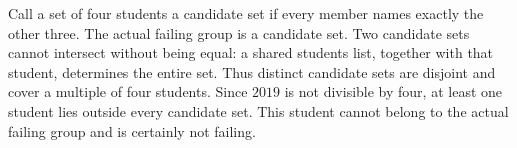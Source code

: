 Call a set of four students a candidate set if every member names exactly the other three. The actual failing group is a candidate set. Two candidate sets cannot intersect without being equal: a shared student\textquotesingle s list, together with that student, determines the entire set. Thus distinct candidate sets are disjoint and cover a multiple of four students. Since $2019$ is not divisible by four, at least one student lies outside every candidate set. This student cannot belong to the actual failing group and is certainly not failing.
